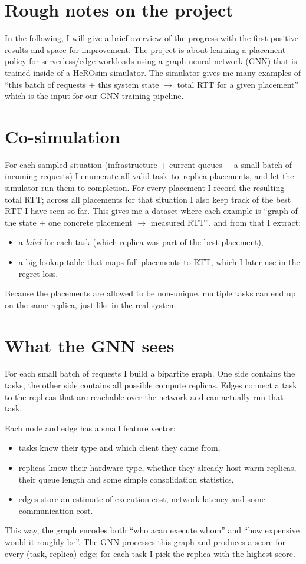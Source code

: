 \documentclass[11pt,a4paper]{article}
\begin{document}
\section*{Rough notes on the project}

In the following, I will give a brief overview of the progress with the first positive results and space for improvement.
The project is about learning a placement policy for serverless/edge workloads using a graph neural network (GNN) that is trained inside of a HeROsim simulator.
The simulator gives me many examples of ``this batch of requests + this system state $\rightarrow$ total RTT for a given placement'' which is the input for our GNN training pipeline.

\section*{Co-simulation}

For each sampled situation (infrastructure + current queues + a small batch of incoming requests) I enumerate all valid task--to--replica placements, and let the simulator run them to completion.
For every placement I record the resulting total RTT; across all placements for that situation I also keep track of the best RTT I have seen so far.
This gives me a dataset where each example is ``graph of the state + one concrete placement $\rightarrow$ measured RTT'', and from that I extract:
\begin{itemize}
  \item a \emph{label} for each task (which replica was part of the best placement),
  \item a big lookup table that maps full placements to RTT, which I later use in the regret loss.
\end{itemize}
Because the placements are allowed to be non-unique, multiple tasks can end up on the same replica, just like in the real system.

\section*{What the GNN sees}

For each small batch of requests I build a bipartite graph.
One side contains the tasks, the other side contains all possible compute replicas.
Edges connect a task to the replicas that are reachable over the network and can actually run that task.

Each node and edge has a small feature vector:
\begin{itemize}
  \item tasks know their type and which client they came from,
  \item replicas know their hardware type, whether they already host warm replicas, their queue length and some simple consolidation statistics,
  \item edges store an estimate of execution cost, network latency and some communication cost.
\end{itemize}
This way, the graph encodes both ``who acan execute whom'' and ``how expensive would it roughly be''.
The GNN processes this graph and produces a score for every (task, replica) edge; for each task I pick the replica with the highest score.
\end{document}
